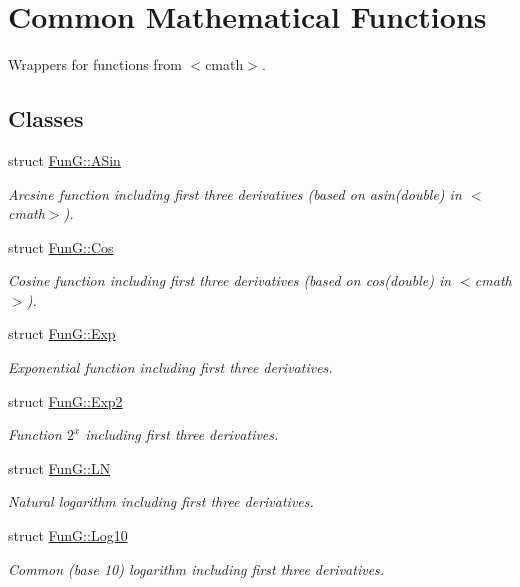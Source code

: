 \hypertarget{group__CMathGroup}{}\section{Common Mathematical Functions}
\label{group__CMathGroup}


Wrappers for functions from $<$cmath$>$.  


\subsection*{Classes}
\begin{DoxyCompactItemize}
\item 
struct \hyperlink{structFunG_1_1ASin}{Fun\+G\+::\+A\+Sin}
\begin{DoxyCompactList}\small\item\em Arcsine function including first three derivatives (based on asin(double) in $<$cmath$>$). \end{DoxyCompactList}\item 
struct \hyperlink{structFunG_1_1Cos}{Fun\+G\+::\+Cos}
\begin{DoxyCompactList}\small\item\em Cosine function including first three derivatives (based on cos(double) in $<$cmath$>$). \end{DoxyCompactList}\item 
struct \hyperlink{structFunG_1_1Exp}{Fun\+G\+::\+Exp}
\begin{DoxyCompactList}\small\item\em Exponential function including first three derivatives. \end{DoxyCompactList}\item 
struct \hyperlink{structFunG_1_1Exp2}{Fun\+G\+::\+Exp2}
\begin{DoxyCompactList}\small\item\em Function $2^x$ including first three derivatives. \end{DoxyCompactList}\item 
struct \hyperlink{structFunG_1_1LN}{Fun\+G\+::\+L\+N}
\begin{DoxyCompactList}\small\item\em Natural logarithm including first three derivatives. \end{DoxyCompactList}\item 
struct \hyperlink{structFunG_1_1Log10}{Fun\+G\+::\+Log10}
\begin{DoxyCompactList}\small\item\em Common (base 10) logarithm including first three derivatives. \end{DoxyCompactList}\item 

\end{DoxyCompactItemize}
